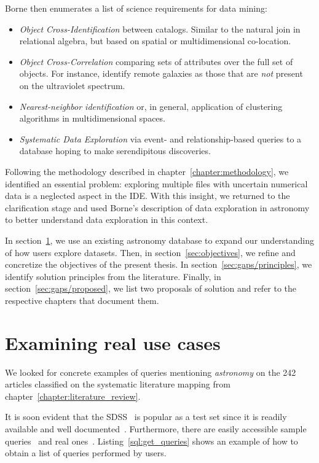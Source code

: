 Borne then enumerates a list of science requirements for data mining:

\begin{itemize}
    \item \emph{Object Cross-Identification} between catalogs. Similar to the natural join
        in relational algebra, but based on spatial or multidimensional co-location.
    \item \emph{Object Cross-Correlation} comparing sets of attributes over the full set of objects.
        For instance, identify remote galaxies as those that are \emph{not} present on
        the ultraviolet spectrum.
    \item \emph{Nearest-neighbor identification} or, in general, application of clustering
        algorithms in multidimensional spaces.
    \item \emph{Systematic Data Exploration} via event- and relationship-based queries to a database
        hoping to make serendipitous discoveries.
\end{itemize}

Following the methodology described in chapter~\ref{chapter:methodology},
we identified an essential problem:
exploring multiple files with uncertain numerical data is a neglected aspect in the \gls{IDE}.
With this insight, we returned to the clarification stage and used Borne's description
of data exploration in astronomy to better understand data exploration in
this context.


In section~\ref{sec:real_use_cases}, we use an existing astronomy database
to expand our understanding of how users explore datasets. Then,
in section~\ref{sec:objectives}, we refine and concretize the objectives
of the present thesis. In section~\ref{sec:gaps/principles}, we identify
solution principles from the literature. Finally, in
section~\ref{sec:gaps/proposed}, we list two proposals of solution and refer
to the respective chapters that document them.

\section{Examining real use cases}
\label{sec:real_use_cases}

We looked for concrete examples of queries mentioning \emph{astronomy} on the
242 articles classified on the systematic literature mapping from
chapter~\ref{chapter:literature_review}.

It is soon evident that the \gls{SDSS}~\cite{SDSS14} is popular as a test
set since it is readily available and well documented~\cite{Gray2002}.
Furthermore, there are easily accessible sample queries~\cite{SDSSSamples}
and real ones~\cite{SDSSSqlLogs}.
Listing~\ref{sql:get_queries} shows an example of how to obtain a list
of queries performed by users.

